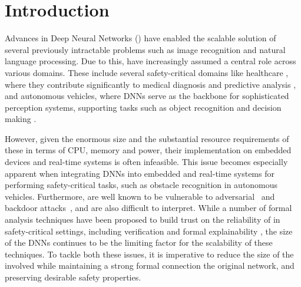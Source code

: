 
\section{Introduction}

Advances in Deep Neural Networks (\dnn) have enabled the scalable solution of
several previously intractable problems such as image recognition and natural
language processing. Due to this, \dnn have increasingly assumed a central role
across various domains. These include several safety-critical domains like
healthcare \cite{b1}, where they contribute significantly to medical
diagnosis and predictive analysis \cite{b2}, and autonomous vehicles, where
DNNs serve as the backbone for sophisticated perception systems, supporting
tasks such as object recognition and decision making \cite{b3}. 

However, given the enormous size and the substantial resource requirements
of these \dnn in terms of CPU, memory and power, their implementation
on embedded devices and real-time systems is often infeasible.
This issue becomes especially apparent when integrating DNNs into embedded and
real-time systems for performing safety-critical tasks, such as obstacle
recognition in autonomous vehicles. 
Furthermore, \dnn are well known to be vulnerable to
adversarial~\cite{l-bfgs,fgsm,deep-fool,pgd,ground-truth-adv-attack,cw-attack}
and backdoor
attacks~\cite{backdoor-poisoning}, and are also difficult to interpret.
While a number of formal analysis techniques have been proposed to build
trust on the reliability of \dnn in safety-critical settings, including
verification \cite{reluplex,deeppoly,crown,beta-crown,cegar-nn}  and formal
explainability \cite{overview-fxai,minimal-image-fxai}, the size of the DNNs
continues to be the limiting factor for the scalability of these techniques.
To tackle both these issues, it is imperative to reduce the size of the \dnn
involved while maintaining a strong formal connection the original network, and
preserving desirable safety properties.

